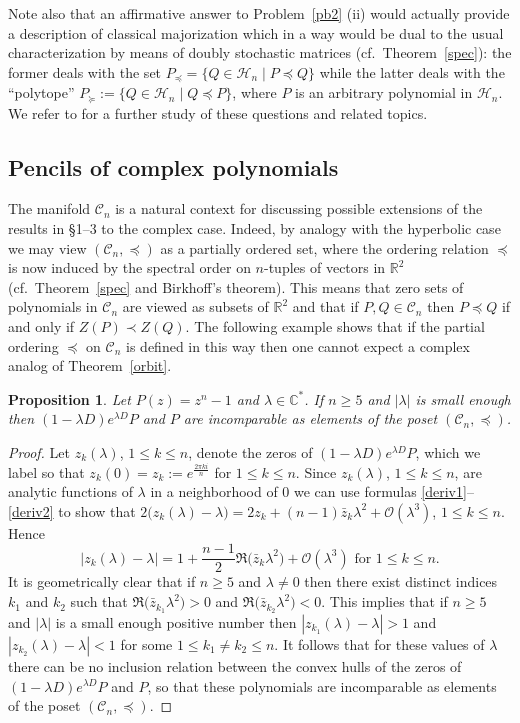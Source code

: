 \documentclass[10pt,twoside,a4paper,reqno]{amsart}
\theoremstyle{plain}
\newtheorem{prop+}           {Proposition}
\theoremstyle{definition}
\theoremstyle{remark}
\newenvironment{proposition}{\begin{prop+}}{\end{prop+}}
\newcommand {\bC} {\mathbb {C}}
\newcommand {\bR} {\mathbb {R}}
\newcommand {\la} {\lambda}
\newcommand {\calH} {\mathcal {H}}
\newcommand {\calC} {\mathcal {C}}
\newcommand {\calO} {\mathcal {O}}
\begin{document}
Note also that an affirmative answer to Problem~\ref{pb2} (ii) would actually 
provide a description of classical majorization which in a way 
would be dual to the usual characterization by means of doubly stochastic 
matrices (cf.~Theorem~\ref{spec}): the former deals with the set 
$P_{\preccurlyeq}=\big\{Q\in \calH_n\mid P\preccurlyeq Q\big\}$ while the 
latter deals with the ``polytope'' 
$P_{\succcurlyeq}:=\big\{Q\in \calH_n\mid Q\preccurlyeq P\big\}$, where 
$P$ is an arbitrary polynomial in $\calH_n$. We refer to \cite{B2} for a 
further study of these questions and related topics.

\subsection{Pencils of complex polynomials}

The manifold $\calC_{n}$ is a 
natural context for discussing possible extensions of the results in 
\S 1--3 to the 
complex case. Indeed, by analogy with the hyperbolic case we may view 
$(\calC_{n},\preccurlyeq)$ as a partially ordered set, where the ordering 
relation $\preccurlyeq$ is now induced by the spectral order on  
$n$-tuples of vectors in $\bR^2$ (cf.~Theorem~\ref{spec} and Birkhoff's 
theorem). This means that zero sets of polynomials in $\calC_{n}$ are 
viewed as subsets of $\bR^{2}$ and that if $P,Q\in \calC_{n}$ then 
$P\preccurlyeq Q$ if and only if $Z(P)\prec Z(Q)$. The following example 
shows that if the partial ordering $\preccurlyeq$ on $\calC_{n}$ is defined 
in this way then one cannot expect a complex analog of Theorem~\ref{orbit}.

\begin{proposition}\label{counter1}
Let $P(z)=z^n-1$ and $\la \in \bC^{*}$. If $n\ge 5$ and $|\la|$ is small 
enough 
then $(1-\la D)e^{\la D}P$ and $P$ are incomparable as elements of the poset 
$(\calC_{n},\preccurlyeq)$.
\end{proposition}

\begin{proof}
Let $z_k(\la)$, $1\le k\le n$, denote the zeros of $(1-\la D)e^{\la D}P$, 
which we label so that $z_k(0)=z_k:=e^{\frac{2\pi k i}{n}}$ for
$1\le k\le n$. Since $z_k(\la)$, $1\le k\le n$, are 
analytic functions of $\la$ in a neighborhood of 0 we can use formulas
\eqref{deriv1}--\eqref{deriv2} to show
that $2\big(z_k(\la)-\la\big)=2z_k+(n-1)\bar{z}_k\la^2+\calO(\la^3)$, 
$1\le k\le n$. Hence
$$|z_k(\la)-\la|
=1+\frac{n-1}{2}\Re\big(\bar{z}_k\la^2\big)+\calO(\la^3)\text{ for } 
1\le k\le n.$$
It is geometrically clear that if $n\ge 5$ and $\la\neq 0$ then there exist 
distinct indices $k_1$ and $k_2$ such that 
$\Re\big(\bar{z}_{k_1}\la^2\big)>0$ and $\Re\big(\bar{z}_{k_2}\la^2\big)<0$. 
This implies that if $n\ge 5$ and $|\la|$ is a small enough positive number 
then $|z_{k_1}(\la)-\la|>1$ and $|z_{k_2}(\la)-\la|<1$ for some 
$1\le k_1\neq k_2\le n$. It follows that for these values of $\la$
there can be no inclusion relation between the convex hulls of 
the zeros of $(1-\la D)e^{\la D}P$ and $P$, so that these polynomials are 
incomparable as elements of the poset $(\calC_{n},\preccurlyeq)$.
\end{proof}
\end{document}

